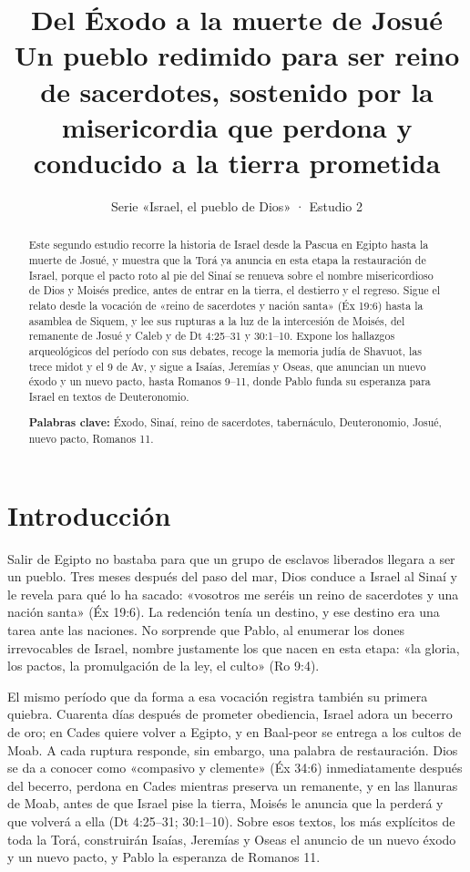 \documentclass[11pt,letterpaper]{article}
\title{\color{ladrillo}\bfseries Del Éxodo a la muerte de Josué\\[4pt]\large\color{cafe}\mdseries Un pueblo redimido para ser reino de sacerdotes, sostenido por la misericordia que perdona y conducido a la tierra prometida}
\author{}\date{\color{sepia}Serie «Israel, el pueblo de Dios» · Estudio 2}
\begin{document}
\maketitle\thispagestyle{empty}

\begin{abstract}\noindent
Este segundo estudio recorre la historia de Israel desde la Pascua en Egipto hasta la muerte de Josué, y muestra que la Torá ya anuncia en esta etapa la restauración de Israel, porque el pacto roto al pie del Sinaí se renueva sobre el nombre misericordioso de Dios y Moisés predice, antes de entrar en la tierra, el destierro y el regreso. Sigue el relato desde la vocación de «reino de sacerdotes y nación santa» (Éx 19:6) hasta la asamblea de Siquem, y lee sus rupturas a la luz de la intercesión de Moisés, del remanente de Josué y Caleb y de Dt 4:25–31 y 30:1–10. Expone los hallazgos arqueológicos del período con sus debates, recoge la memoria judía de Shavuot, las trece midot y el 9 de Av, y sigue a Isaías, Jeremías y Oseas, que anuncian un nuevo éxodo y un nuevo pacto, hasta Romanos 9–11, donde Pablo funda su esperanza para Israel en textos de Deuteronomio.
\par\smallskip\noindent\textbf{Palabras clave:} Éxodo, Sinaí, reino de sacerdotes, tabernáculo, Deuteronomio, Josué, nuevo pacto, Romanos 11.
\end{abstract}

\section{Introducción}

Salir de Egipto no bastaba para que un grupo de esclavos liberados llegara a ser un pueblo. Tres meses después del paso del mar, Dios conduce a Israel al Sinaí y le revela para qué lo ha sacado: «vosotros me seréis un reino de sacerdotes y una nación santa» (Éx 19:6). La redención tenía un destino, y ese destino era una tarea ante las naciones. No sorprende que Pablo, al enumerar los dones irrevocables de Israel, nombre justamente los que nacen en esta etapa: «la gloria, los pactos, la promulgación de la ley, el culto» (Ro 9:4).

El mismo período que da forma a esa vocación registra también su primera quiebra. Cuarenta días después de prometer obediencia, Israel adora un becerro de oro; en Cades quiere volver a Egipto, y en Baal-peor se entrega a los cultos de Moab. A cada ruptura responde, sin embargo, una palabra de restauración. Dios se da a conocer como «compasivo y clemente» (Éx 34:6) inmediatamente después del becerro, perdona en Cades mientras preserva un remanente, y en las llanuras de Moab, antes de que Israel pise la tierra, Moisés le anuncia que la perderá y que volverá a ella (Dt 4:25–31; 30:1–10). Sobre esos textos, los más explícitos de toda la Torá, construirán Isaías, Jeremías y Oseas el anuncio de un nuevo éxodo y un nuevo pacto, y Pablo la esperanza de Romanos 11.
\end{document}
